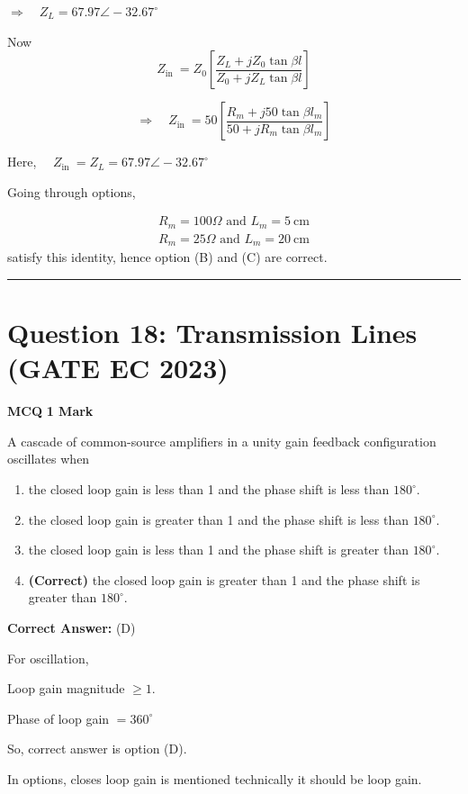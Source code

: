 \documentclass[11pt,a4paper]{article}
\begin{document}
\begin{tcolorbox}[solbox, title=Detailed Solution -- Question 17]
$\Rightarrow \quad Z_{L}=67.97 \angle-32.67^{\circ}$

Now 
\[
Z_{\text {in }}=Z_{0}\left[\frac{Z_{L}+j Z_{0} \tan \beta l}{Z_{0}+j Z_{L} \tan \beta l}\right]
\]

\[
\Rightarrow \quad Z_{\text {in }}=50\left[\frac{R_{m}+j 50 \tan \beta l_{m}}{50+j R_{m} \tan \beta l_{m}}\right]
\]

Here, $\quad Z_{\text {in }}=Z_{L}=67.97 \angle-32.67^{\circ}$

Going through options,

\[
\left.\begin{array}{l}R_{m}=100 \Omega \text { and } L_{m}=5 \mathrm{~cm} \\ R_{m}=25 \Omega \text { and } L_{m}=20 \mathrm{~cm}\end{array}\right.
\]
 satisfy this identity, hence option (B) and (C) are correct.
\end{tcolorbox}

\vspace{1.5em}
\hrule
\vspace{1.5em}

\section*{Question 18: Transmission Lines (GATE EC 2023)}
\noindent \textbf{\color{primary}MCQ} \hfill \textbf{\color{secondary}1 Mark}


\noindent A cascade of common-source amplifiers in a unity gain feedback configuration oscillates when


\begin{enumerate}[label=(\Alph*)]
    \item the closed loop gain is less than 1 and the phase shift is less than $180^{\circ}$.
    \item the closed loop gain is greater than 1 and the phase shift is less than $180^{\circ}$.
    \item the closed loop gain is less than 1 and the phase shift is greater than $180^{\circ}$.
    \item \textbf{(Correct)} the closed loop gain is greater than 1 and the phase shift is greater than $180^{\circ}$.
\end{enumerate}

\noindent \textbf{Correct Answer:} (D)

\begin{tcolorbox}[solbox, title=Detailed Solution -- Question 18]
For oscillation,

 Loop gain magnitude $\geq 1$.

Phase of loop gain $=360^{\circ}$

So, correct answer is option (D).

 In options, closes loop gain is mentioned technically it should be loop gain.
\end{tcolorbox}
\end{document}
